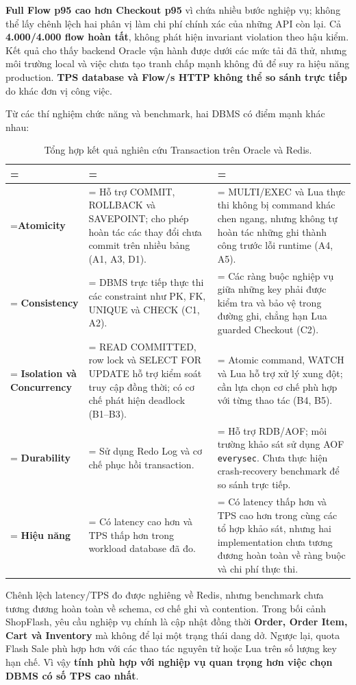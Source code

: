 \textbf{Full Flow p95 cao hơn Checkout p95} vì chứa nhiều bước nghiệp vụ; không thể lấy chênh lệch hai phân vị làm chi phí chính xác của những API còn lại. Cả \textbf{4.000/4.000 flow hoàn tất}, không phát hiện invariant violation theo hậu kiểm. Kết quả cho thấy backend Oracle vận hành được dưới các mức tải đã thử, nhưng môi trường local và việc chưa tạo tranh chấp mạnh không đủ để suy ra hiệu năng production. \textbf{TPS database và Flow/s HTTP không thể so sánh trực tiếp} do khác đơn vị công việc.

\label{sec:tx-3-4}
Từ các thí nghiệm chức năng và benchmark, hai DBMS có điểm mạnh khác nhau:

\begin{table}[H]
\centering
\caption{Tổng hợp kết quả nghiên cứu Transaction trên Oracle và Redis.}\label{tab:tx-15}
\reporttablesetup
\footnotesize
\begin{tabularx}{\linewidth}{|>{\hsize\linewidth=\hsize}L|>{\hsize\linewidth=\hsize}L|>{\hsize\linewidth=\hsize}L|}
\hline
{}
 &  &  \\ \hline
\textbf{Atomicity} & Hỗ trợ COMMIT, ROLLBACK và SAVEPOINT; cho phép hoàn tác các thay đổi chưa commit trên nhiều bảng (A1, A3, D1). & MULTI/EXEC và Lua thực thi không bị command khác chen ngang, nhưng không tự hoàn tác những ghi thành công trước lỗi runtime (A4, A5). \\ \hline
\textbf{Consistency} & DBMS trực tiếp thực thi các constraint như PK, FK, UNIQUE và CHECK (C1, A2). & Các ràng buộc nghiệp vụ giữa những key phải được kiểm tra và bảo vệ trong đường ghi, chẳng hạn Lua guarded Checkout (C2). \\ \hline
\textbf{Isolation và Concurrency} & READ COMMITTED, row lock và SELECT FOR UPDATE hỗ trợ kiểm soát truy cập đồng thời; có cơ chế phát hiện deadlock (B1–B3). & Atomic command, WATCH và Lua hỗ trợ xử lý xung đột; cần lựa chọn cơ chế phù hợp với từng thao tác (B4, B5). \\ \hline
\textbf{Durability} & Sử dụng Redo Log và cơ chế phục hồi transaction. & Hỗ trợ RDB/AOF; môi trường khảo sát sử dụng AOF \texttt{everysec}. Chưa thực hiện crash-recovery benchmark để so sánh trực tiếp. \\ \hline
\textbf{Hiệu năng} & Có latency cao hơn và TPS thấp hơn trong workload database đã đo. & Có latency thấp hơn và TPS cao hơn trong cùng các tổ hợp khảo sát, nhưng hai implementation chưa tương đương hoàn toàn về ràng buộc và chi phí thực thi. \\ \hline
\end{tabularx}
\end{table}
Chênh lệch latency/TPS đo được nghiêng về Redis, nhưng benchmark chưa tương đương hoàn toàn về schema, cơ chế ghi và contention. Trong bối cảnh ShopFlash, yêu cầu nghiệp vụ chính là cập nhật đồng thời \textbf{Order, Order Item, Cart và Inventory} mà không để lại một trạng thái dang dở. Ngược lại, quota Flash Sale phù hợp hơn với các thao tác nguyên tử hoặc Lua trên số lượng key hạn chế. Vì vậy \textbf{tính phù hợp với nghiệp vụ quan trọng hơn việc chọn DBMS có số TPS cao nhất}.

